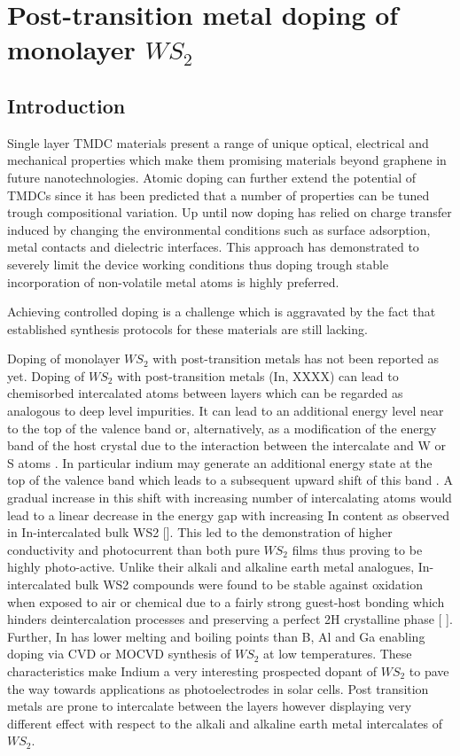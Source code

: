 \chapter{Post-transition metal doping of monolayer $WS_2$}

\section{Introduction}

Single layer TMDC materials present a range of unique optical, electrical and mechanical properties which make them promising materials beyond graphene in future nanotechnologies.
Atomic doping can further extend the potential of TMDCs since it has been predicted that a number of properties can be tuned trough compositional variation. Up until now doping has relied on charge transfer induced by changing the environmental conditions such as surface adsorption, metal contacts and dielectric interfaces. This approach has demonstrated to severely limit the device working conditions thus doping trough stable incorporation of non-volatile metal atoms is highly preferred.

Achieving controlled doping is a challenge which is aggravated by the fact that established synthesis protocols for these materials are still lacking.

Doping of monolayer $WS_2$ with post-transition metals has not been reported as yet. Doping of $WS_2$ with post-transition metals (In, XXXX) can lead to chemisorbed intercalated atoms between layers which can be regarded as analogous to deep level impurities. It can lead to an additional energy level near to the top of the valence band or, alternatively, as a modification of the energy band of the host crystal due to the interaction between the intercalate and W or S atoms \cite{Yacobi1979}\cite{Yacobi1979a}. In particular indium may generate an additional energy state at the top of the valence band which leads to a subsequent upward shift of this band \cite{Deshpande2001}. A gradual increase in this shift with increasing number of intercalating atoms would lead to a linear decrease in the energy gap with increasing In content as observed in In-intercalated bulk WS2 []. This led to the demonstration of higher conductivity and photocurrent than both pure $WS_2$ films thus proving to be highly photo-active. 
Unlike their alkali and alkaline earth metal analogues, In-intercalated bulk WS2 compounds were found to be stable against oxidation when exposed to air or chemical due to a fairly strong guest-host bonding which hinders deintercalation processes and preserving a perfect 2H crystalline phase [ ]. 
Further, In has lower melting and boiling points than B, Al and Ga enabling doping via CVD or MOCVD synthesis of $WS_2$ at low temperatures.
These characteristics make Indium a very interesting prospected dopant of $WS_2$ to pave the way towards applications as photoelectrodes in solar cells.
Post transition metals are prone to intercalate between the layers however displaying very different effect with respect to the alkali and alkaline earth metal intercalates of $WS_2$.


